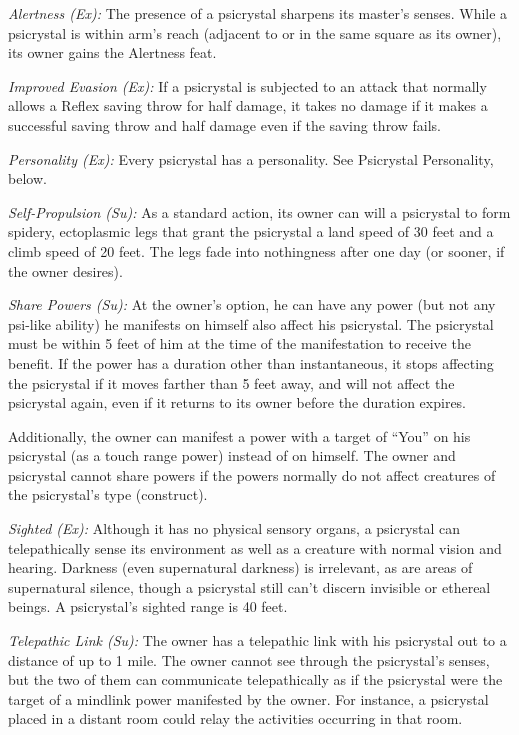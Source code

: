 \textit{Alertness (Ex):} The presence of a psicrystal sharpens its master's senses. While a psicrystal is within arm's reach (adjacent to or in the same square as its owner), its owner gains the Alertness feat.

\textit{Improved Evasion (Ex):} If a psicrystal is subjected to an attack that normally allows a Reflex saving throw for half damage, it takes no damage if it makes a successful saving throw and half damage even if the saving throw fails.

\textit{Personality (Ex):} Every psicrystal has a personality. See Psicrystal Personality, below.

\textit{Self-Propulsion (Su):} As a standard action, its owner can will a psicrystal to form spidery, ectoplasmic legs that grant the psicrystal a land speed of 30 feet and a climb speed of 20 feet. The legs fade into nothingness after one day (or sooner, if the owner desires).

\textit{Share Powers (Su):} At the owner's option, he can have any power (but not any psi-like ability) he manifests on himself also affect his psicrystal. The psicrystal must be within 5 feet of him at the time of the manifestation to receive the benefit. If the power has a duration other than instantaneous, it stops affecting the psicrystal if it moves farther than 5 feet away, and will not affect the psicrystal again, even if it returns to its owner before the duration expires.

Additionally, the owner can manifest a power with a target of ``You'' on his psicrystal (as a touch range power) instead of on himself. The owner and psicrystal cannot share powers if the powers normally do not affect creatures of the psicrystal's type (construct).

\textit{Sighted (Ex):} Although it has no physical sensory organs, a psicrystal can telepathically sense its environment as well as a creature with normal vision and hearing. Darkness (even supernatural darkness) is irrelevant, as are areas of supernatural silence, though a psicrystal still can't discern invisible or ethereal beings. A psicrystal's sighted range is 40 feet.

\textit{Telepathic Link (Su):} The owner has a telepathic link with his psicrystal out to a distance of up to 1 mile. The owner cannot see through the psicrystal's senses, but the two of them can communicate telepathically as if the psicrystal were the target of a mindlink power manifested by the owner. For instance, a psicrystal placed in a distant room could relay the activities occurring in that room.

